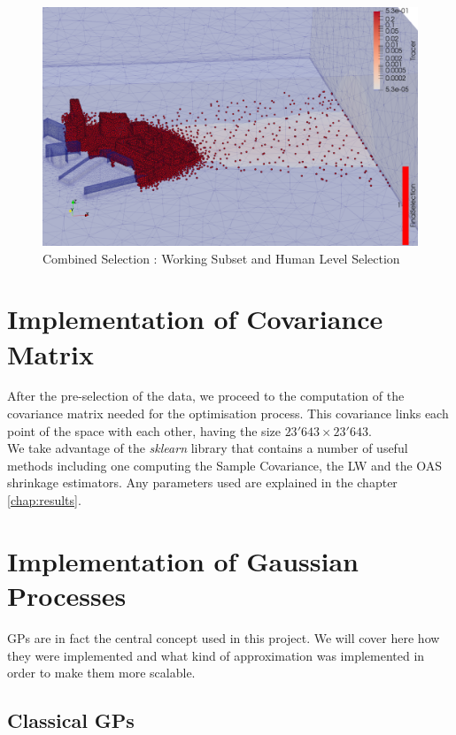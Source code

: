 \begin{figure}[h!]
\centering
	\includegraphics[width = 0.8 \linewidth]{figures/Subset/FinalSelection_zoom}
	\caption{Combined Selection : Working Subset and Human Level Selection}
	\label{fig:combined_selection}
\end{figure}


\section{Implementation of Covariance Matrix}

After the pre-selection of the data, we proceed to the computation of the covariance matrix needed for the optimisation process. This covariance links each point of the space with each other, having the size $23'643 \times 23'643 $.\\

We take advantage of the \textit{sklearn} library that contains a number of useful methods including one computing the Sample Covariance, the LW and the OAS shrinkage estimators. Any parameters used are explained in the chapter \ref{chap:results}. \\



\section{Implementation of Gaussian Processes}

GPs are in fact the central concept used in this project. We will cover here how they were implemented and what kind of approximation was implemented in order to make them more scalable. 


\subsection{Classical GPs}

